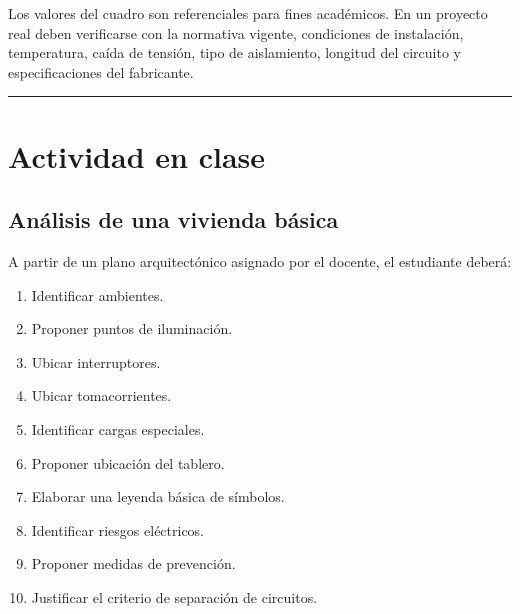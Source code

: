 \documentclass[
  spanish,
  letterpaper,
  DIV=11,
  numbers=noendperiod]{scrreprt}
\providecommand{\tightlist}{%
  \setlength{\itemsep}{0pt}\setlength{\parskip}{0pt}}
\begin{document}
\begin{tcolorbox}[enhanced jigsaw, arc=.35mm, bottomrule=.15mm, bottomtitle=1mm, breakable, colback=white, colbacktitle=quarto-callout-important-color!10!white, colframe=quarto-callout-important-color-frame, coltitle=black, left=2mm, leftrule=.75mm, opacityback=0, opacitybacktitle=0.6, rightrule=.15mm, title=\textcolor{quarto-callout-important-color}{\faExclamation}\hspace{0.5em}{Importante}, titlerule=0mm, toprule=.15mm, toptitle=1mm]

Los valores del cuadro son referenciales para fines académicos. En un
proyecto real deben verificarse con la normativa vigente, condiciones de
instalación, temperatura, caída de tensión, tipo de aislamiento,
longitud del circuito y especificaciones del fabricante.

\end{tcolorbox}

\begin{center}\rule{0.5\linewidth}{0.5pt}\end{center}

\section{Actividad en clase}\label{actividad-en-clase}

\subsection{Análisis de una vivienda
básica}\label{anuxe1lisis-de-una-vivienda-buxe1sica}

A partir de un plano arquitectónico asignado por el docente, el
estudiante deberá:

\begin{enumerate}
\def\labelenumi{\arabic{enumi}.}
\tightlist
\item
  Identificar ambientes.
\item
  Proponer puntos de iluminación.
\item
  Ubicar interruptores.
\item
  Ubicar tomacorrientes.
\item
  Identificar cargas especiales.
\item
  Proponer ubicación del tablero.
\item
  Elaborar una leyenda básica de símbolos.
\item
  Identificar riesgos eléctricos.
\item
  Proponer medidas de prevención.
\item
  Justificar el criterio de separación de circuitos.
\end{enumerate}
\end{document}
